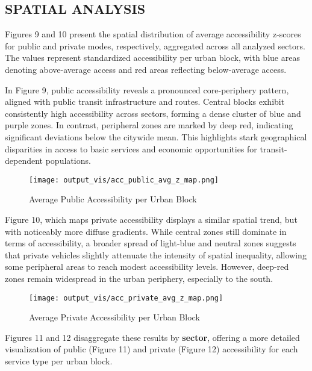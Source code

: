 \documentclass[
  12pt,
]{report}
\begin{document}
\subsection{SPATIAL ANALYSIS}\label{spatial-analysis}

Figures 9 and 10 present the spatial distribution of average
accessibility z-scores for public and private modes, respectively,
aggregated across all analyzed sectors. The values represent
standardized accessibility per urban block, with blue areas denoting
above-average access and red areas reflecting below-average access.

In Figure 9, public accessibility reveals a pronounced core-periphery
pattern, aligned with public transit infrastructure and routes. Central
blocks exhibit consistently high accessibility across sectors, forming a
dense cluster of blue and purple zones. In contrast, peripheral zones
are marked by deep red, indicating significant deviations below the
citywide mean. This highlights stark geographical disparities in access
to basic services and economic opportunities for transit-dependent
populations.

\begin{figure}[H]

{\centering \texttt{[image: output\_vis/acc\_public\_avg\_z\_map.png]}

}

\caption{Average Public Accessibility per Urban Block}

\end{figure}%

Figure 10, which maps private accessibility displays a similar spatial
trend, but with noticeably more diffuse gradients. While central zones
still dominate in terms of accessibility, a broader spread of light-blue
and neutral zones suggests that private vehicles slightly attenuate the
intensity of spatial inequality, allowing some peripheral areas to reach
modest accessibility levels. However, deep-red zones remain widespread
in the urban periphery, especially to the south.

\begin{figure}[H]

{\centering \texttt{[image: output\_vis/acc\_private\_avg\_z\_map.png]}

}

\caption{Average Private Accessibility per Urban Block}

\end{figure}%

Figures 11 and 12 disaggregate these results by \textbf{sector},
offering a more detailed visualization of public (Figure 11) and private
(Figure 12) accessibility for each service type per urban block.
\end{document}
